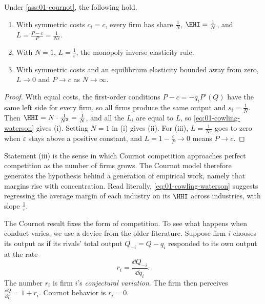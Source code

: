 \begin{corollary}\label{cor:01-cournot-cases}
Under \cref{ass:01-cournot}, the following hold.
\begin{enumerate}[label=(\roman*)]
  \item With symmetric costs $c_i = c$, every firm has share $\frac{1}{N}$, $\HHI = \frac{1}{N}$, and
  $L = \frac{P - c}{P} = \frac{1}{N\varepsilon}$.
  \item With $N = 1$, $L = \frac{1}{\varepsilon}$, the monopoly inverse elasticity rule.
  \item With symmetric costs and an equilibrium elasticity bounded away from zero, $L \to 0$ and $P \to c$ as
  $N \to \infty$.
\end{enumerate}
\end{corollary}

\begin{proof}
With equal costs, the first-order conditions $P - c = -q_i P'(Q)$ have the same left side for every firm, so all
firms produce the same output and $s_i = \frac{1}{N}$. Then $\HHI = N \cdot \frac{1}{N^2} = \frac{1}{N}$, and all
the $L_i$ are equal to $L$, so \eqref{eq:01-cowling-waterson} gives (i). Setting $N = 1$ in (i) gives (ii). For
(iii), $L = \frac{1}{N\varepsilon}$ goes to zero when $\varepsilon$ stays above a positive constant, and
$L = 1 - \frac{c}{P} \to 0$ means $P \to c$.
\end{proof}

Statement (iii) is the sense in which Cournot competition approaches perfect competition as the number of firms
grows. The Cournot model therefore generates the hypothesis behind a generation of empirical work, namely that
margins rise with concentration. Read literally, \eqref{eq:01-cowling-waterson} suggests regressing the average
margin of each industry on its $\HHI$ across industries, with slope $\frac{1}{\varepsilon}$.

The Cournot result fixes the form of competition. To see what happens when conduct varies, we use a device from
the older literature. Suppose firm $i$ chooses its output as if its rivals' total output $Q_{-i} = Q - q_i$
responded to its own output at the rate
\[
  r_i = \frac{\dd Q_{-i}}{\dd q_i} .
\]
The number $r_i$ is firm $i$'s \emph{conjectural variation}. The firm then perceives
$\frac{\dd Q}{\dd q_i} = 1 + r_i$. Cournot behavior is $r_i = 0$.

